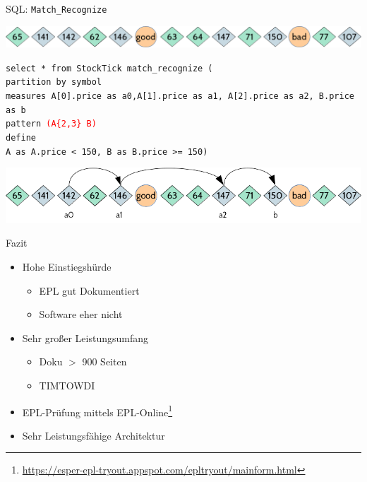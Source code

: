 \documentclass[usenames,dvipsnames]{beamer}
\begin{document}
\begin{frame}{SQL: \texttt{Match\_Recognize}}
\begin{center}
    \includegraphics[scale=0.4]{img/stream-2}
\end{center}

\begin{exampleblock}{}
\texttt{select * from StockTick \textcolor{Bittersweet}{match\_recognize} (\\
\textcolor{Bittersweet}{partition} by symbol\\
\textcolor{Bittersweet}{measures} A[0].price as a0,A[1].price as a1, A[2].price as a2, 
B.price as b\\
\textcolor{Bittersweet}{pattern} \textcolor{red}{(A\{2,3\} B)}\\
\textcolor{Bittersweet}{define}\\
A as A.price < 150,
B as B.price >= 150)
}
\end{exampleblock}

\begin{center}
    \includegraphics[scale=0.6]{img/solution-i}
\end{center}

\end{frame}

\begin{frame}{Fazit}
   \begin{itemize}
       \item Hohe Einstiegshürde
       \begin{itemize}
           \item EPL gut Dokumentiert
           \item Software eher nicht
       \end{itemize}
       \item Sehr großer Leistungsumfang
       \begin{itemize}
           \item Doku $>$ 900 Seiten
           \item TIMTOWDI
       \end{itemize}
       \item EPL-Prüfung mittels 
       EPL-Online\footnote{\url{https://esper-epl-tryout.appspot.com/epltryout/mainform.html}}
       \item Sehr Leistungsfähige Architektur
   \end{itemize}
\end{frame}
\end{document}
